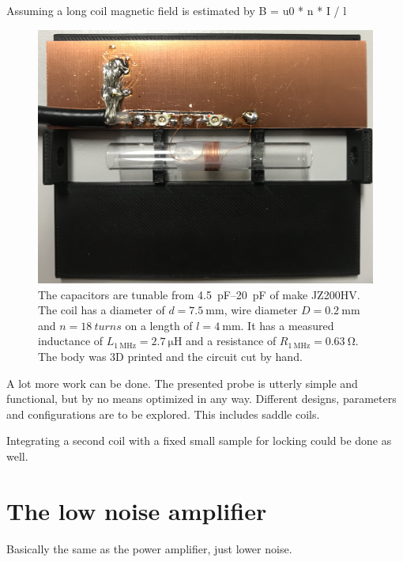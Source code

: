 Assuming a long coil magnetic field is estimated by
B = u0 * n * I / l \cite{mispelterNMRProbeheadsBiophysical2015}

\begin{figure}[hbt]
    \centering
    \includegraphics[width=\textwidth]{images/probe.jpg}
    \caption{ The capacitors are tunable from \qtyrange{4.5}{20}{\pico\farad} of make JZ200HV. The coil has a diameter of \(d = \qty{7.5}{\milli\meter}\), wire diameter \(D = \qty{0.2}{\milli\meter}\) and \(n = \qty{18}{turns}\) on a length of \(l = \qty{4}{\milli\meter}\). It has a measured inductance of \(L_{\qty{1}{\mega\hertz}} = \qty{2.7}{\micro\henry}\) and a resistance of \(R_{\qty{1}{\mega\hertz}} = \qty{0.63}{\ohm}\). The body was 3D printed and the circuit cut by hand.}
\end{figure}

A lot more work can be done. The presented probe is utterly simple and functional, but by no means optimized in any way. Different designs, parameters and configurations are to be explored. This includes saddle coils.

Integrating a second coil with a fixed small sample for locking could be done as well.

\section{The low noise amplifier}

Basically the same as the power amplifier, just lower noise.

